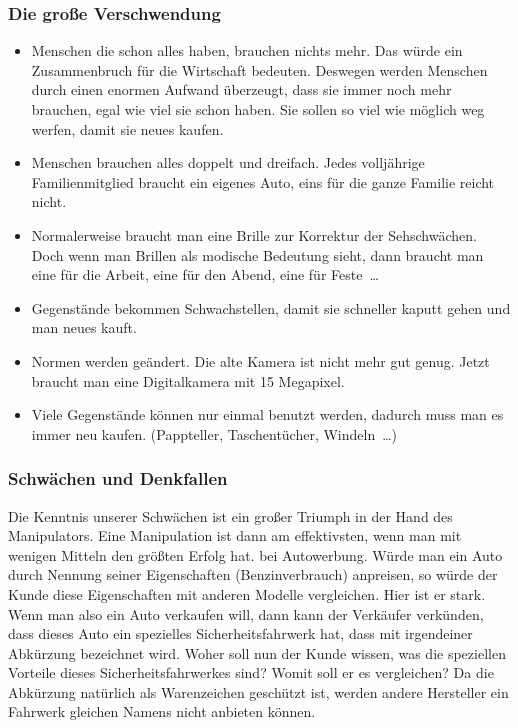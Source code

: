 \subsubsection{Die große Verschwendung}
\begin{itemize}
	\item Menschen die schon alles haben, brauchen nichts mehr. Das würde ein Zusammenbruch für die
Wirtschaft bedeuten. Deswegen werden Menschen durch einen enormen Aufwand überzeugt, dass sie immer
noch mehr brauchen, egal wie viel sie schon haben. Sie sollen so viel wie möglich weg werfen, damit
sie neues kaufen.

	\item Menschen brauchen alles doppelt und dreifach. Jedes volljährige Familienmitglied braucht
ein eigenes Auto, eins für die ganze Familie reicht nicht.
	\item Normalerweise braucht man eine Brille zur Korrektur der Sehschwächen. Doch wenn man Brillen
als modische Bedeutung sieht, dann braucht man eine für die Arbeit, eine für den Abend, eine für
Feste~\dots

	\item Gegenstände bekommen Schwachstellen, damit sie schneller kaputt gehen und man neues kauft.

	\item Normen werden geändert. Die alte Kamera ist nicht mehr gut genug. Jetzt braucht man eine
Digitalkamera mit 15 Megapixel.

	\item Viele Gegenstände können nur einmal benutzt werden, dadurch muss man es immer neu kaufen.
(Pappteller, Taschentücher, Windeln~\dots)
\end{itemize}

\subsubsection{Schwächen und Denkfallen}
Die Kenntnis unserer Schwächen ist ein großer Triumph in der Hand des Manipulators. Eine Manipulation
ist dann am effektivsten, wenn man mit wenigen Mitteln den größten Erfolg hat.
\zB bei Autowerbung. Würde man ein Auto durch Nennung seiner Eigenschaften (Benzinverbrauch)
anpreisen, so würde der Kunde diese Eigenschaften mit anderen Modelle vergleichen. Hier ist er stark.
Wenn man also ein Auto verkaufen will, dann kann der Verkäufer \zB verkünden, dass dieses Auto ein
spezielles Sicherheitsfahrwerk hat, dass mit irgendeiner Abkürzung bezeichnet wird. Woher soll nun
der Kunde wissen, was die speziellen Vorteile dieses Sicherheitsfahrwerkes sind? Womit soll er es
vergleichen? Da die Abkürzung natürlich als Warenzeichen geschützt ist, werden andere Hersteller ein
Fahrwerk gleichen Namens nicht anbieten können.

